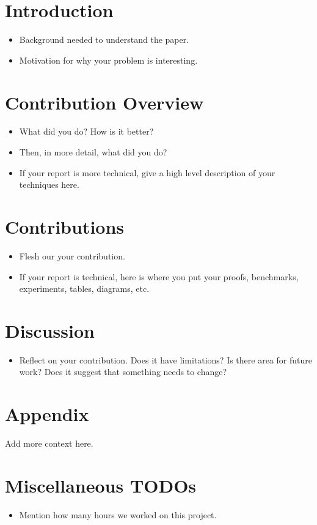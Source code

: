 \documentclass[letterpaper,12pt]{article}
\begin{document}
\pagestyle{fancy}

\section{Introduction}

\begin{itemize}
  \item Background needed to understand the paper.
  \item Motivation for why your problem is interesting.
\end{itemize}

\section{Contribution Overview}

\begin{itemize}
  \item What did you do? How is it better?
  \item Then, in more detail, what did you do?
  \item If your report is more technical, give a high level description of your techniques here.
\end{itemize}

\section{Contributions}

\begin{itemize}
  \item Flesh our your contribution.
  \item If your report is technical, here is where you put your proofs, benchmarks, experiments, tables, diagrams, etc.
\end{itemize}

\section{Discussion}

\begin{itemize}
  \item Reflect on your contribution. Does it have limitations? Is there area for future work? Does it suggest that something needs to change?
\end{itemize}

\section{Appendix}

Add more context here.

\section{Miscellaneous TODOs}

\begin{itemize}
  \item Mention how many hours we worked on this project.
\end{itemize}
\end{document}
